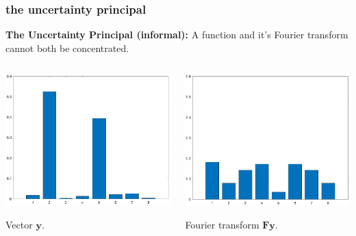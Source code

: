 \documentclass[compress]{beamer}
\newcommand{\bv}[1]{\mathbf{#1}}
\begin{document}
\begin{frame}
	\frametitle{the uncertainty principal}
	\textbf{The Uncertainty Principal (informal):} A function and it's Fourier transform cannot both be concentrated. 
	\vspace{1em}
	\begin{columns}
		\begin{column}{.5\textwidth}
			\centering
			\includegraphics[width=.8\textwidth]{y.png}
			
			Vector $\bv{y}.$
		\end{column}
			\begin{column}{.5\textwidth}
		\centering
		\includegraphics[width=.8\textwidth]{Fy.png}
		
		Fourier transform $\bv{Fy}.$
	\end{column}
	\end{columns}
\end{frame}
\end{document}
